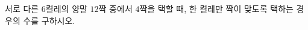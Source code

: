 \hspace*{2mm}\begin{minipage}[t]{\dimexpr\linewidth-2mm\relax}\vspace{0pt}
서로 다른 $6$켤레의 양말 $12$짝 중에서 $4$짝을 택할 때, 한 켤레만 짝이 맞도록 택하는 경우의 수를 구하시오.\end{minipage}
